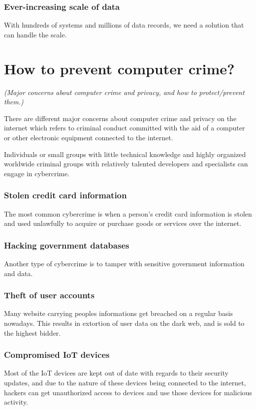 \documentclass[12pt, a4paper]{article}
\begin{document}
\subsubsection{Ever-increasing scale of data}
With hundreds of systems and millions of data records, we need a solution that
can handle the scale.%

\section{How to prevent computer crime?}%
\begin{center}
  \emph{(Major concerns about computer crime and privacy, and how to
  protect/prevent them.)}
\end{center}
There are different major concerns about computer crime and privacy on the
internet which refers to criminal conduct committed with the aid of a computer
or other electronic equipment connected to the internet.

Individuals or small groups with little technical knowledge and highly
organized worldwide criminal groups with relatively talented developers and 
specialists can engage in cybercrime.

\subsubsection{Stolen credit card information}
The most common cybercrime is when a person's credit card information is
stolen and used unlawfully to acquire or purchase goods or services over the
internet.
\subsubsection{Hacking government databases}
Another type of cybercrime is to tamper with sensitive government information
and data.
\subsubsection{Theft of user accounts}
Many website carrying peoples informations get breached on a regular basis 
nowadays. This results in extortion of user data on the dark web, and is sold 
to the highest bidder.
\subsubsection{Compromised IoT devices}
Most of the IoT devices are kept out of date with regards to their security 
updates, and due to the nature of these devices being connected to the
internet, hackers can get unauthorized access to devices and use those devices
for malicious activity.
\end{document}
